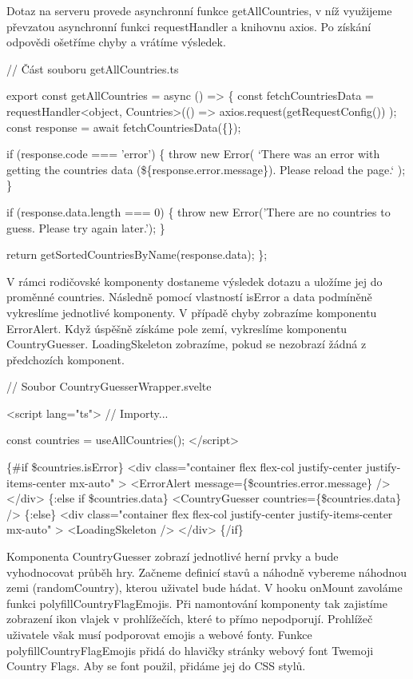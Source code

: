 Dotaz na serveru provede asynchronní funkce getAllCountries, v níž využijeme převzatou asynchronní funkci requestHandler a knihovnu axios. Po získání odpovědi ošetříme chyby a vrátíme výsledek.

\begin{prog}
// Část souboru getAllCountries.ts

export const getAllCountries = async () => \{
  const fetchCountriesData = requestHandler<object, Countries>(() =>
    axios.request(getRequestConfig())
  );
  const response = await fetchCountriesData(\{\});

  if (response.code === 'error') \{
    throw new Error(
      `There was an error with getting the countries data 
      (\$\{response.error.message\}). Please reload the page.`
    );
  \}

  if (response.data.length === 0) \{
    throw new Error('There are no countries to guess. Please try again later.');
  \}

  return getSortedCountriesByName(response.data);
\};
\end{prog}

V rámci rodičovské komponenty dostaneme výsledek dotazu a uložíme jej do proměnné countries. Následně pomocí vlastností isError a data podmíněně vykreslíme jednotlivé komponenty. 
V případě chyby zobrazíme komponentu ErrorAlert. Když úspěšně získáme pole zemí, vykreslíme komponentu CountryGuesser. LoadingSkeleton zobrazíme, pokud se nezobrazí žádná z předchozích komponent.

\begin{prog}
// Soubor CountryGuesserWrapper.svelte

<script lang="ts">
  // Importy...

  const countries = useAllCountries();
</script>

\{#if \$countries.isError\}
  <div 
    class="container flex flex-col justify-center justify-items-center mx-auto"
  >
    <ErrorAlert message=\{\$countries.error.message\} />
  </div>
\{:else if \$countries.data\}
  <CountryGuesser countries=\{\$countries.data\} />
\{:else\}
  <div 
    class="container flex flex-col justify-center justify-items-center mx-auto"
  >
    <LoadingSkeleton />
  </div>
\{/if\}
\end{prog}

Komponenta CountryGuesser zobrazí jednotlivé herní prvky a bude vyhodnocovat průběh hry. Začneme definicí stavů a náhodně vybereme náhodnou zemi (randomCountry), kterou uživatel bude hádat. 
V hooku onMount zavoláme funkci polyfillCountryFlagEmojis. Při namontování komponenty tak zajistíme zobrazení ikon vlajek v prohlížečích, které to přímo nepodporují. Prohlížeč uživatele však musí podporovat emojis a webové fonty. 
Funkce polyfillCountryFlagEmojis přidá do hlavičky stránky webový font Twemoji Country Flags. Aby se font použil, přidáme jej do CSS stylů.

